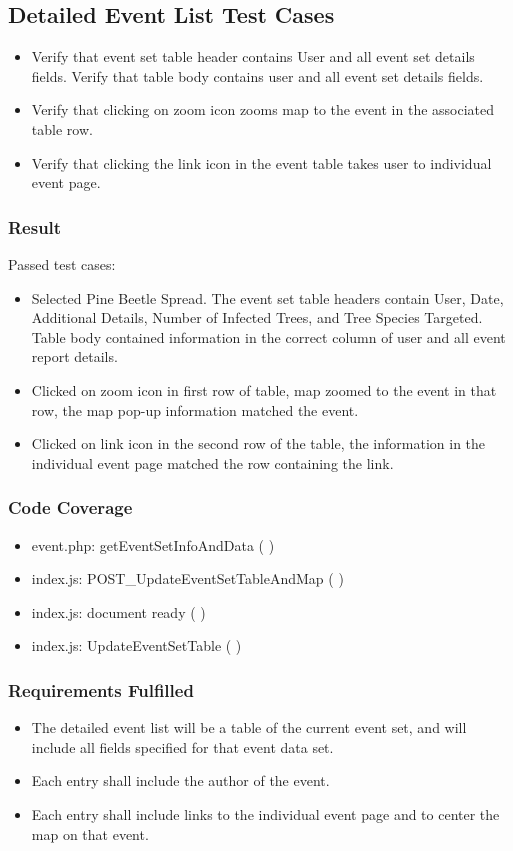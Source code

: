 \subsection{Detailed Event List Test Cases}
\begin{itemize}
\item Verify that event set table header contains User and all event set details fields. Verify that table body contains user and all  event set details fields.
\item Verify that clicking on zoom icon zooms map to the event in the associated table row. 
\item Verify that clicking the link icon in the event table takes user to individual event page.
\end{itemize}
\subsubsection{Result}
Passed test cases:
\begin{itemize}
\item Selected Pine Beetle Spread. The event set table headers contain User, Date, Additional Details, Number of Infected Trees, and Tree Species Targeted. Table body contained information in the correct column of user and all event report details. 
\item Clicked on zoom icon in first row of table, map zoomed to the event in that row, the map pop-up information matched the event.
\item Clicked on link icon in the second row of the table, the information in the individual event page matched the row containing the link.
\end{itemize}
\subsubsection{Code Coverage}
\begin{itemize}
\item event.php: getEventSetInfoAndData ( )
\item index.js: POST\_UpdateEventSetTableAndMap ( )
\item index.js: document ready ( )
\item index.js: UpdateEventSetTable ( )
\end{itemize}
\subsubsection{Requirements Fulfilled}
\begin{itemize}
\item The detailed event list will be a table of the current event set, and will include all fields specified for that event data set.
\item Each entry shall include the author of the event.
\item Each entry shall include links to the individual event page and to center the map on that event.
\end{itemize}

